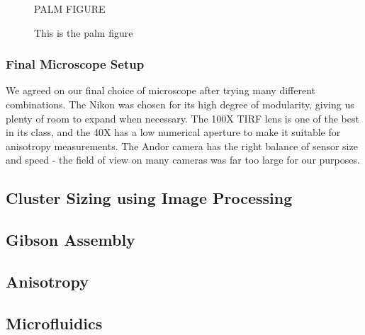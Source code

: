 \documentclass[../main.tex]{subfiles}
\begin{document}
\begin{figure}[h!]
PALM FIGURE
\caption{This is the palm figure}
\end{figure}

\subsubsection{Final Microscope Setup}

We agreed on our final choice of microscope after trying many different combinations. The Nikon was chosen for its high degree of modularity, giving us plenty of room to expand when necessary. The 100X TIRF lens is one of the best in its class, and the 40X has a low numerical aperture to make it suitable for anisotropy measurements\cite{lakowicz}. The Andor camera has the right balance of sensor size and speed - the field of view on many cameras was far too large for our purposes.

\subsection{Cluster Sizing using Image Processing}

\subsection{Gibson Assembly}

\subsection{Anisotropy}

\subsection{Microfluidics}
\end{document}
